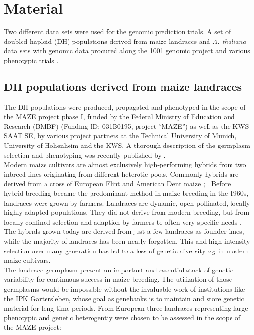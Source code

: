 \section{Material}
Two different data sets were used for the genomic prediction trials. A set of
doubled-haploid (DH) populations derived from maize landraces and \textit{A. thaliana}
data sets with genomic data procured along the 1001 genomic project \cite{1001genome} and
various phenotypic trials \cite{seren2016arapheno}.


\subsection{DH populations derived from maize landraces}
The DH populations were produced, propagated and phenotyped in the scope of the MAZE
project phase I, funded by the Federal Ministry of Education and Research (BMBF) (Funding
ID: 031B0195, project “MAZE”) as well as the KWS SAAT SE, by various project partners at
the Technical University of Munich, University of Hohenheim and the KWS. A thorough
description of the germplasm selection and phenotyping was recently published by
\cite{holker2019european}. \\
Modern maize cultivars are almost exclusively high-performing hybrids from two inbreed
lines originating from different heterotic pools. Commonly hybrids are derived from a
cross of European Flint and American Dent maize \cite{dos2004priori};
\cite{brauner2019testcross}. Before hybrid breeding became the predominant method in maize
breeding in the 1960s, landraces were grown by farmers. Landraces are dynamic,
open-pollinated, locally highly-adapted populations. They did not derive from modern
breeding, but from locally confined selection and adaption by farmers to often very
specific needs \cite{arteaga2016genomic}. The hybrids grown today are derived from just a
few landraces as founder lines, while the majority of landraces has been nearly
forgotten. This and high intensity selection over many generation has led to a loss of
genetic diversity $\sigma_G$ in modern maize cultivars.\\
The landrace germplasm present an important and essential stock of genetic variability for
continuous success in maize breeding. The utilization of those germplasms would be
impossible without the invaluable work of institutions like the IPK Gartersleben, whose
goal as genebanks is to maintain and store genetic material for long time periods. From
European three landraces representing large phenotypic and genetic heterogentiy were
chosen to be assessed in the scope of the MAZE project:

